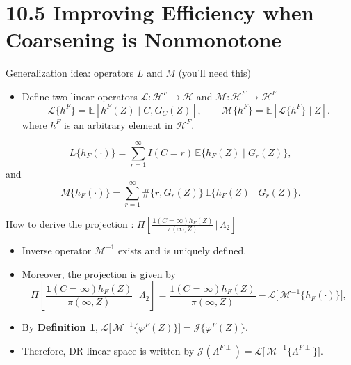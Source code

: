 \documentclass[xcolor=dvipsnames,aspectratio=169]{beamer}
\newcommand{\E}{\mathbb{E}}
\newcommand{\1}{\mathbbm{1}}
\begin{document}
\section{10.5 Improving Efficiency when Coarsening is Nonmonotone}

\begin{frame}{Generalization idea: operators $L$ and $M$ (you’ll need this)}
  \begin{tcolorbox}[colframe=red,title=Definition 4 and 5]
    \begin{itemize}
      \item Define two linear operators $\mathcal{L}:\mathcal{H}^{F}\to\mathcal{H}$ and  $\mathcal{M}:\mathcal{H}^{F}\to\mathcal{H}^{F}$
      \[
        \mathcal{L}\{h^{F}\} = \E\!\left[h^{F}(Z)\mid C,G_C(Z)\right],
        \qquad
        \mathcal{M}\{h^{F}\} = \E\!\left[\mathcal{L}\{h^{F}\}\mid Z\right].
      \]
      where $h^F$ is an arbitrary element in $\mathcal{H}^F$.
    \end{itemize}
  \end{tcolorbox}
    \[
        L\{h_F(\cdot)\} = \sum_{r=1}^{\infty} I(C=r)\,\E\{h_F(Z)\mid G_r(Z)\},
    \]
    and 
    \[
        M\{h_F(\cdot)\} = \sum_{r=1}^{\infty} \#\{r,G_r(Z)\}\,\E\{h_F(Z)\mid G_r(Z)\}.
    \]
\end{frame}

\begin{frame}{How to derive the projection : $\Pi\!\left[
        \frac{\mathbf{1}(C=\infty)h_F(Z)}{\pi(\infty,Z)}
        \,\Bigg|\, \Lambda_2
        \right]$}
  \begin{tcolorbox}[colframe=Cyan,title=Theorem 10.6]
    \begin{itemize}
      \item Inverse operator $\mathcal{M}^{-1}$ exists and is uniquely defined. 
      \item Moreover, the projection is given by
      \[
        \Pi\!\left[
        \frac{\mathbf{1}(C=\infty)h_F(Z)}{\pi(\infty,Z)}
        \,\Bigg|\, \Lambda_2
        \right]
        = \frac{\mathcal{1} (C=\infty)h_F(Z)}{\pi(\infty,Z)} 
        - \mathcal{L}\!\big[\,\mathcal{M}^{-1}\{h_F(\cdot)\}\big],
    \]
    \end{itemize}
  \end{tcolorbox}
  \begin{itemize}
    \item By \textbf{Definition 1}, $\mathcal{L}\!\big[\,\mathcal{M}^{-1}\{\varphi^F(Z)\}\big]=\mathcal{J}\{\varphi^F(Z)\}$.
    \item Therefore, DR linear space is written by $\mathcal{J}(\Lambda^{F\perp})=\mathcal{L}\!\big[\,\mathcal{M}^{-1}\{\Lambda^{F\perp}\}\big]$.
  \end{itemize}
\end{frame}
\end{document}
